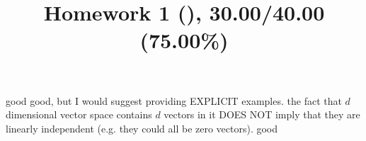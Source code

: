 \documentclass[10pt]{article} %
\title{Homework 1 (),
30.00/40.00 (75.00\%)
}
\begin{document}
\maketitle
{}
good
good, but I would suggest providing EXPLICIT examples.
the fact that $d$ dimensional vector space contains $d$ vectors in it DOES NOT imply that
they are linearly independent (e.g. they could all be zero vectors).
good
\end{document}
